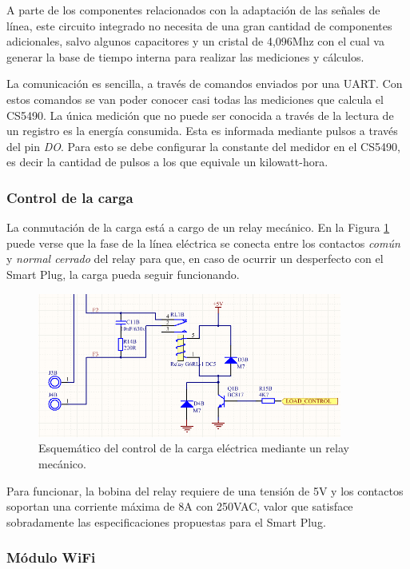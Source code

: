 A parte de los componentes relacionados con la adaptación de las señales de línea, este circuito integrado  no necesita de una gran cantidad de componentes adicionales, salvo algunos capacitores y un cristal de 4,096Mhz con el cual va generar la base de tiempo interna para realizar las mediciones y cálculos.

La comunicación es sencilla, a través de comandos enviados por una UART. Con estos comandos se van poder conocer casi todas las mediciones que calcula el CS5490. La única medición que no puede ser conocida a través de la lectura de un registro es la energía consumida. Esta es informada mediante pulsos a través del pin \textit{DO}. Para esto se debe configurar la constante del medidor en el CS5490, es decir la cantidad de pulsos a los que equivale un kilowatt-hora.


\subsubsection{Control de la carga}

La conmutación de la carga está a cargo de un relay mecánico. En la Figura \ref{fig:pcb_control_carga} puede verse que la fase de la línea eléctrica se conecta entre los contactos \textit{común} y \textit{normal cerrado} del relay para que, en caso de ocurrir un desperfecto con el Smart Plug, la carga pueda seguir funcionando.

\begin{figure}[h]
	\centering
	\includegraphics[width=10cm]{./Figures/3_1_2_pcb_control_carga.png}
	\caption{Esquemático del control de la carga eléctrica mediante un relay mecánico.}
	\label{fig:pcb_control_carga}
\end{figure}

Para funcionar, la bobina del relay requiere de una tensión de 5V y los contactos soportan una corriente máxima de 8A con 250VAC, valor que satisface sobradamente las especificaciones propuestas para el Smart Plug.

\subsubsection{Módulo WiFi}

